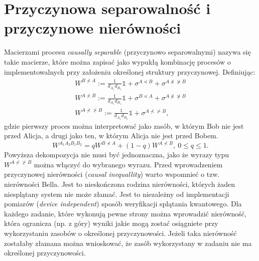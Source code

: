\documentclass[10pt]{article} %
\newcommand{\WAll}{W^{A_1A_2B_1B_2}}
\newcommand{\I}{\mathbb{1}}
\begin{document}
\section{Przyczynowa separowalność i przyczynowe nierówności}
Macierzami procesu \textit{causally separable} (przyczynowo separowalnymi) nazywa się takie macierze, które można zapisać jako wypukłą kombinację procesów o implementowalnych przy założeniu określonej struktury przyczynowej. Definiując:
\begin{gather}
W^{B \nprec A} := \frac{1}{d_{A_1}d_{B_1}}\I + \sigma^{A \preceq B} + \sigma^{A \npreceq \nsucceq B} \\
W^{A \nprec B} := \frac{1}{d_{A_1}d_{B_1}}\I + \sigma^{B \preceq A} + \sigma^{A \npreceq \nsucceq B} \\
W^{A \nprec \nsucc B} := \frac{1}{d_{A_1}d_{B_1}}\I + \sigma^{A \nprec \nsucc B},
\end{gather}
gdzie pierwszy proces można interpretować jako zasób, w którym Bob nie jest przed Alicja, a drugi jako ten, w którym Alicja nie jest przed Bobem.
\begin{equation}
\label{eq:sep}
\WAll = qW^{B \nprec A} + (1-q)W^{A \nprec B},~0 \leq q \leq 1.
\end{equation}
Powyższa dekompozycja nie musi być jednoznaczna, jako że wyrazy typu $W^{A \nprec \nsucc B}$ można włączyć do wybranego wyrazu.
Przed wprowadzeniem przyczynowej nierówności (\textit{causal inequallity}) warto wspomnieć o tzw. nierówności Bella. Jest to nieskończona rodzina nierówności, których żaden niesplątany system nie może złamać. Jest to niezależny od implementacji pomiarów (\textit{device independent}) sposób weryfikacji splątania kwantowego. Dla każdego zadanie, które wykonują pewne strony można wprowadzić nierówność, która ogranicza (np. z góry) wyniki jakie mogą zostać osiągniete przy wykorzystaniu zasobów o określonej przyczynowości. Jeżeli taka nierówność zostałaby złamana można wnioskować, że zasób wykorzystany w zadaniu nie ma określonej przyczynowości.
\end{document}
